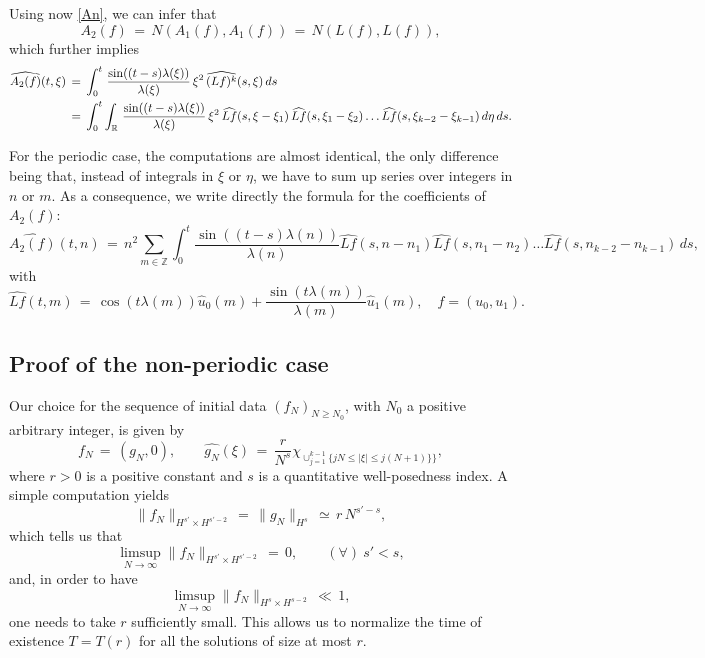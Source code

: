 \documentclass{amsart}
\newcommand{\wh}{\widehat}
\begin{document}
Using now \eqref{An}, we can infer that
\[
A_2(f)\,=\,N(A_1(f),A_1(f))\,=\,N(L(f),L(f)),\]
which further implies
\begin{equation}
\aligned
\widehat{A_2(f)}(t,\xi)\,&=\,\int_0^t\,\frac{\sin((t-s) \lambda(\xi))}{\lambda(\xi)}\, \xi^2\, \widehat{(Lf)^k}(s,\xi)\,ds\\
&=\,\int_0^t \int_{\mathbb{R}}\,\frac{\sin((t-s) \lambda(\xi))}{\lambda(\xi)}\, \xi^2\, \widehat{Lf}(s,\xi-\xi_{1})\,\widehat{Lf}(s,\xi_{1} - \xi_{2})\dots \wh{Lf}(s, \xi_{k-2}-\xi_{k-1})\,d\eta\,ds.\endaligned
\label{A2f}
\end{equation}

For the periodic case, the computations are almost identical, the only difference being that, instead of integrals in $\xi$ or $\eta$, we have to sum up series over integers in $n$ or $m$. As a consequence, we write directly the formula for the coefficients of $A_2(f)$:
\begin{equation}
\widehat{A_2(f)}(t,n)\,=\, n^2 \sum_{m\in\mathbb{Z}} \int_0^t \frac{\sin((t-s) \lambda(n))}{\lambda(n)} \widehat{Lf}(s,n - n_{1}) \wh{Lf}(s, n_{1} - n_{2}) \dots \wh{Lf}(s, n_{k-2} - n_{k-1})\,ds,
\label{A2p}\end{equation}
with
\[
\widehat{Lf}(t,m)\,=\,\cos(t \lambda(m)) \hat{u}_0(m)+\frac{\sin(t \lambda(m))}{\lambda(m)} \hat{u}_1(m),\quad f=(u_0,u_1).\]


\subsection{Proof of the non-periodic case} Our choice for the sequence of initial data $(f_N)_{N\geq N_0}$, with $N_0$ a positive arbitrary integer, is given by
\begin{equation}
f_N\,=\,(g_N, 0), \qquad \widehat{g_N}(\xi)\,=\,\frac{r}{N^s} \chi_{\cup_{j=1}^{k-1}\{jN \leq |\xi| \leq j(N + 1)\}\}},
\label{fn}
\end{equation}
where $r>0$ is a positive constant and $s$ is a quantitative well-posedness index. A simple computation yields
\begin{equation}
\|f_N\|_{H^{s'}\times H^{s'-2}}\,=\,\|g_N\|_{H^s}\,\simeq\,r\,N^{s'-s},
\label{hsfn}
\end{equation}
which tells us that
\[
\limsup_{N\to \infty} \|f_N\|_{H^{s'} \times H^{s' -2}}\,=\,0, \qquad (\forall)\ s'<s, 
\]
and, in order to have 
\[
\limsup_{N\to \infty} \|f_N\|_{H^s \times H^{s -2}}\,\ll\,1,
\]
one needs to take $r$ sufficiently small. This allows us to normalize the time of existence $T=T(r)$ for all the solutions of size at most $r$.
\end{document}
